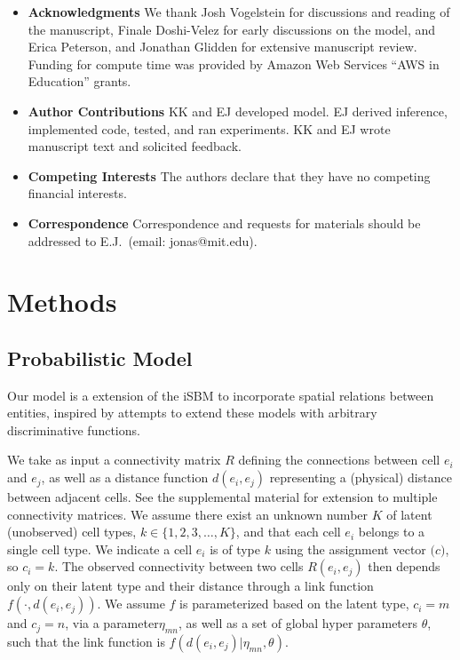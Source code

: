 \documentclass{article}
\renewcommand{\vec}[1]{\mathbf{#1}}
\begin{document}
\begin{itemize}

 \item \textbf{Acknowledgments} We thank Josh Vogelstein for discussions and reading of the manuscript, Finale Doshi-Velez for early discussions on the model, and Erica Peterson, and Jonathan Glidden for extensive manuscript review. Funding for compute time was provided by Amazon Web Services ``AWS in Education'' grants. 
\item \textbf{Author Contributions} KK and EJ developed model. EJ derived inference, implemented code, tested, and ran experiments. KK and EJ wrote manuscript text and solicited feedback. 
 \item \textbf{Competing Interests} The authors declare that they have no
competing financial interests.
 \item \textbf{Correspondence} Correspondence and requests for materials
should be addressed to E.J.~(email: jonas@mit.edu).
\end{itemize}

\newpage
\section{Methods }

\subsection{Probabilistic Model}

Our model is a extension of the iSBM
\autocite{Kemp2006a,Xu2006} to incorporate spatial relations between entities,
inspired by attempts to extend these models with arbitrary
discriminative functions\autocite{Murphy2012}.

We take as input a connectivity matrix $R$ defining the connections
between cell $e_i$ and $e_j$, as well as a distance function $d(e_i,
e_j)$ representing a (physical) distance between adjacent cells. See
the supplemental material for extension to multiple connectivity
matrices. We assume there exist an unknown number $K$ of latent
(unobserved) cell types, $k \in \{1, 2, 3, \dots, K\}$, and that each
cell $e_i$ belongs to a single cell type. We indicate a cell $e_i$ is
of type $k$ using the assignment vector $\vec(c)$, so $c_i = k$. The
observed connectivity between two cells $R(e_i, e_j)$ then depends
only on their latent type and their distance through a link function
$f(\cdot, d(e_i, e_j))$. We assume $f$ is parameterized based on the
latent type, $c_i=m$ and $c_j=n$, via a parameter$\eta_{mn}$, as well
as a set of global hyper parameters $\theta$, such that the link
function is $f(d(e_i, e_j) | \eta_{mn}, \theta)$. 
\end{document}
